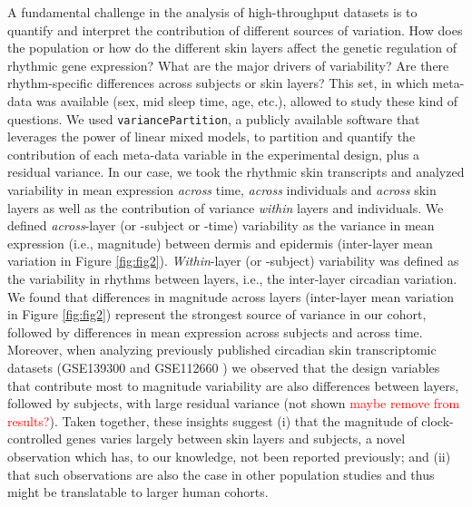 A fundamental challenge in the analysis of high-throughput datasets is to quantify and interpret the contribution of different sources of variation. How does the population or how do the different skin layers affect the genetic regulation of rhythmic gene expression? What are the major drivers of variability? Are there rhythm-specific differences across subjects or skin layers? This set, in which meta-data was available (sex, mid sleep time, age, etc.), allowed to study these kind of questions. We used \texttt{variancePartition}, a publicly available software that leverages the power of linear mixed models, to partition and quantify the contribution of each meta-data variable in the experimental design, plus a residual variance. In our case, we took the rhythmic skin transcripts and analyzed variability in mean expression \textit{across} time, \textit{across} individuals and \textit{across} skin layers as well as the contribution of variance \textit{within }layers and individuals. We defined \textit{across}-layer (or -subject or -time) variability as the variance in mean expression (i.e., magnitude) between dermis and epidermis (inter-layer mean variation in Figure \ref{fig:fig2}). \textit{Within}-layer (or -subject) variability was defined as the variability in rhythms between layers, i.e., the inter-layer circadian variation.\\

We found that differences in magnitude across layers (inter-layer mean variation in Figure \ref{fig:fig2}) represent the strongest source of variance in our cohort, followed by differences in mean expression across subjects and across time. Moreover, when analyzing previously published circadian skin transcriptomic datasets (GSE139300 \cite{GSE139300} and GSE112660 \cite{GSE112660}) we observed that the design variables that contribute most to magnitude variability are also differences between layers, followed by subjects, with large residual variance (not shown \textcolor{red}{maybe remove from results?}). Taken together, these insights suggest (i) that the magnitude of clock-controlled genes varies largely between skin layers and subjects, a novel observation which has, to our knowledge, not been reported previously; and (ii) that such observations are also the case in other population studies and thus might be translatable to larger human cohorts. \\

